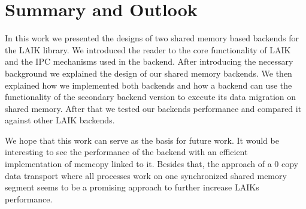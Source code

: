 
\chapter{Summary and Outlook}\label{chapter:summary_and_outlook}

In this work we presented the designs of two shared memory based backends for the LAIK library.
We introduced the reader to the core functionality of LAIK and the IPC mechanisms used in the backend.
After introducing the necessary background we explained the design of our shared memory backends.
We then explained how we implemented both backends and how a backend can use the functionality of the secondary backend version to execute its data migration on shared memory.
After that we tested our backends performance and compared it against other LAIK backends.

We hope that this work can serve as the basis for future work.
It would be interesting to see the performance of the backend with an efficient implementation of memcopy linked to it.
Besides that, the approach of a 0 copy data transport where all processes work on one synchronized shared memory segment seems to be a promising approach to further increase LAIKs performance. 